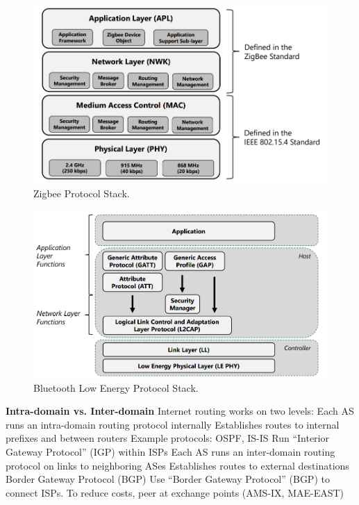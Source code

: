 \documentclass[11 pt]{scrartcl}
\begin{document}
\begin{figure}[!htb]
    \centering
    \includegraphics[scale=0.6]{assets/zigbee.png}
    \caption{Zigbee Protocol Stack.}
\end{figure}
\begin{figure}[!htb]
    \centering
    \includegraphics[scale=0.6]{assets/bluetooth_low_energy.png}
    \caption{Bluetooth Low Energy Protocol Stack.}
\end{figure}
\textbf{Intra-domain vs. Inter-domain}\newline
Internet routing works on two levels:
\itemnum
    \ii Each AS runs an intra-domain routing protocol internally
    \itemnum
        \ii Establishes routes to internal prefixes and between routers
        \ii Example protocols: OSPF, IS-IS
        \ii Run “Interior Gateway Protocol” (IGP) within ISPs
    \itemend
    \ii Each AS runs an inter-domain routing protocol on links to neighboring ASes
    \itemnum
        \ii Establishes routes to external destinations
        \ii Border Gateway Protocol (BGP)
        \ii Use “Border Gateway Protocol” (BGP) to connect ISPs. To reduce costs, peer at exchange points (AMS-IX, MAE-EAST)
\end{document}
